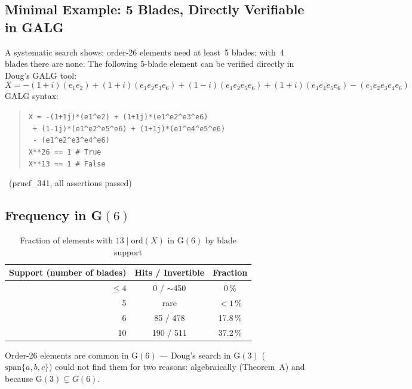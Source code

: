 \subsection{Minimal Example: 5 Blades, Directly Verifiable in GALG}
\label{sec:minimal_en}

A systematic search shows: order-26 elements need at least~5 blades;
with~4 blades there are none. The following 5-blade element
can be verified directly in Doug's GALG tool:
\begin{equation}
  X = -(1+i)(e_1 e_2) + (1+i)(e_1 e_2 e_3 e_6) + (1-i)(e_1 e_2 e_5 e_6)
      + (1+i)(e_1 e_4 e_5 e_6) - (e_1 e_2 e_3 e_4 e_6)
\end{equation}
GALG syntax:
\begin{quote}
\texttt{X = -(1+1j)*(e1\^{}e2) + (1+1j)*(e1\^{}e2\^{}e3\^{}e6)}\\
\texttt{  + (1-1j)*(e1\^{}e2\^{}e5\^{}e6) + (1+1j)*(e1\^{}e4\^{}e5\^{}e6)}\\
\texttt{  - (e1\^{}e2\^{}e3\^{}e4\^{}e6)}\\
\texttt{X**26 == 1  \# True}\\
\texttt{X**13 == 1  \# False}
\end{quote}
\BM\ (pruef\_341, all assertions passed)

\subsection{Frequency in G$(6)$}

\begin{table}[H]
\centering
\caption{Fraction of elements with $13 \mid \text{ord}(X)$ in G$(6)$ by blade support}
\begin{tabular}{rcc}
\toprule
Support (number of blades) & Hits / Invertible & Fraction \\
\midrule
$\leq 4$ & 0 / $\sim$450 & 0\,\% \\
5 & rare & $< 1$\,\% \\
6 & 85 / 478 & 17.8\,\% \\
10 & 190 / 511 & 37.2\,\% \\
\bottomrule
\end{tabular}
\end{table}

Order-26 elements are common in G$(6)$ --- Doug's search in G$(3)$
($\text{span}\{a,b,c\}$) could not find them for two reasons:
algebraically (Theorem~A) and because G$(3) \subsetneq G(6)$.

